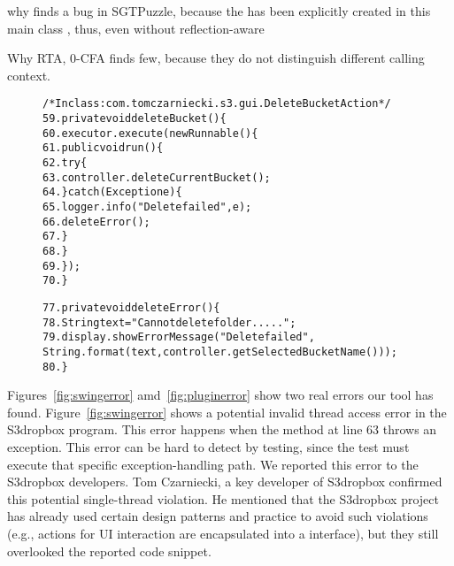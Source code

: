why finds a bug in SGTPuzzle, because the  has been
explicitly created in this main class  ,
thus, even without reflection-aware

Why RTA, 0-CFA finds few, because they do not distinguish different
calling context.


\begin{figure}[t]
\begin{CodeOut}
\begin{alltt}
/* In class: com.tomczarniecki.s3.gui.DeleteBucketAction */
59.private void deleteBucket() \{
60.    executor.execute(new Runnable() \{
61.        public void run() \{
62.            try \{
63.                controller.deleteCurrentBucket();
64.            \} catch (Exception e) \{
65.                logger.info("Delete failed", e);
66.                deleteError(); 
67.            \}
68.       \}
69.    \});
70.\}

77.private void deleteError() \{
78.    String text = "Cannot delete folder .....";
79.    display.showErrorMessage("Delete failed", 
        String.format(text, controller.getSelectedBucketName())); 
80.\}
\end{alltt}
\end{CodeOut}
\vspace*{-2.0ex}  %
\end{figure}

Figures~\ref{fig:swingerror} amd~\ref{fig:pluginerror} show
two real errors our tool has found. Figure~\ref{fig:swingerror}
shows a potential invalid thread access error in the S3dropbox
program. This error happens when the 
method at line 63 throws an exception. This error can be hard to
detect by testing, since the test must  execute that specific exception-handling
path. We reported this error to the S3dropbox developers. Tom Czarniecki,
a key developer of S3dropbox confirmed this potential single-thread
violation. He mentioned that the S3dropbox project has already
used certain design patterns and practice to avoid such violations (e.g.,
actions for UI interaction are encapsulated into a  interface),
but they still overlooked  the reported code snippet. 

